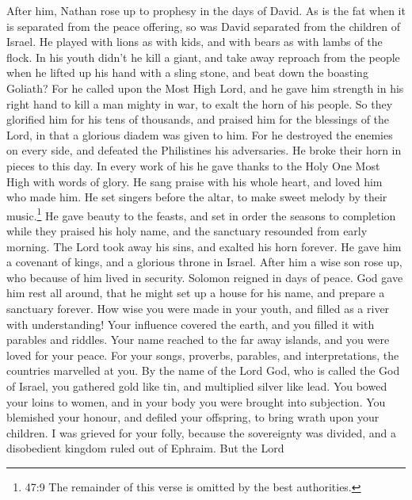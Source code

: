  After him, Nathan rose up to prophesy in the days of David.
 As is the fat when it is separated from the peace offering,
so was David separated from the children of Israel.  He
played with lions as with kids, and with bears as with lambs of the
flock.  In his youth didn't he kill a giant, and take away
reproach from the people when he lifted up his hand with a sling stone,
and beat down the boasting Goliath?  For he called upon the
Most High Lord, and he gave him strength in his right hand to kill a man
mighty in war, to exalt the horn of his people.  So they
glorified him for his tens of thousands, and praised him for the
blessings of the Lord, in that a glorious diadem was given to him.
 For he destroyed the enemies on every side, and defeated
the Philistines his adversaries. He broke their horn in pieces to this
day.  In every work of his he gave thanks to the Holy One
Most High with words of glory. He sang praise with his whole heart, and
loved him who made him.  He set singers before the altar, to
make sweet melody by their music.\footnote{47:9 The remainder of this
  verse is omitted by the best authorities.}  He gave
beauty to the feasts, and set in order the seasons to completion while
they praised his holy name, and the sanctuary resounded from early
morning.  The Lord took away his sins, and exalted his horn
forever. He gave him a covenant of kings, and a glorious throne in
Israel.  After him a wise son rose up, who because of him
lived in security.  Solomon reigned in days of peace. God
gave him rest all around, that he might set up a house for his name, and
prepare a sanctuary forever.  How wise you were made in
your youth, and filled as a river with understanding!  Your
influence covered the earth, and you filled it with parables and
riddles.  Your name reached to the far away islands, and
you were loved for your peace.  For your songs, proverbs,
parables, and interpretations, the countries marvelled at you.
 By the name of the Lord God, who is called the God of
Israel, you gathered gold like tin, and multiplied silver like lead.
 You bowed your loins to women, and in your body you were
brought into subjection.  You blemished your honour, and
defiled your offspring, to bring wrath upon your children. I was grieved
for your folly,  because the sovereignty was divided, and a
disobedient kingdom ruled out of Ephraim.  But the Lord
